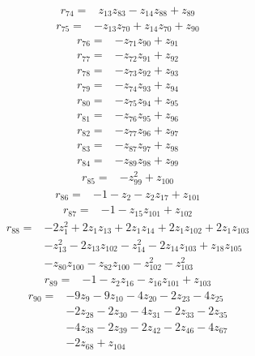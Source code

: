\begin{align*}
r_{74}={}&z_{13}z_{83} -z_{14}z_{88} +z_{89}
\end{align*}
\begin{align*}
r_{75}={}&-z_{13}z_{70} +z_{14}z_{70} +z_{90}
\end{align*}
\begin{align*}
r_{76}={}&-z_{71}z_{90} +z_{91}
\end{align*}
\begin{align*}
r_{77}={}&-z_{72}z_{91} +z_{92}
\end{align*}
\begin{align*}
r_{78}={}&-z_{73}z_{92} +z_{93}
\end{align*}
\begin{align*}
r_{79}={}&-z_{74}z_{93} +z_{94}
\end{align*}
\begin{align*}
r_{80}={}&-z_{75}z_{94} +z_{95}
\end{align*}
\begin{align*}
r_{81}={}&-z_{76}z_{95} +z_{96}
\end{align*}
\begin{align*}
r_{82}={}&-z_{77}z_{96} +z_{97}
\end{align*}
\begin{align*}
r_{83}={}&-z_{87}z_{97} +z_{98}
\end{align*}
\begin{align*}
r_{84}={}&-z_{89}z_{98} +z_{99}
\end{align*}
\begin{align*}
r_{85}={}&-z_{99}^{2} +z_{100}
\end{align*}
\begin{align*}
r_{86}={}&-1 -z_{2} -z_{2}z_{17} +z_{101}
\end{align*}
\begin{align*}
r_{87}={}&-1 -z_{15}z_{101} +z_{102}
\end{align*}
\begin{align*}
r_{88}={}&-2z_{1}^{2} +2z_{1}z_{13} +2z_{1}z_{14} +2z_{1}z_{102} +2z_{1}z_{103}\\
&-z_{13}^{2} -2z_{13}z_{102} -z_{14}^{2} -2z_{14}z_{103} +z_{18}z_{105}\\
&-z_{80}z_{100} -z_{82}z_{100} -z_{102}^{2} -z_{103}^{2}
\end{align*}
\begin{align*}
r_{89}={}&-1 -z_{2}z_{16} -z_{16}z_{101} +z_{103}
\end{align*}
\begin{align*}
r_{90}={}&-9z_{9} -9z_{10} -4z_{20} -2z_{23} -4z_{25}\\
&-2z_{28} -2z_{30} -4z_{31} -2z_{33} -2z_{35}\\
&-4z_{38} -2z_{39} -2z_{42} -2z_{46} -4z_{67}\\
&-2z_{68} +z_{104}
\end{align*}
